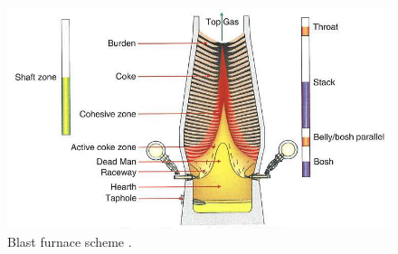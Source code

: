\begin{figure}[!htb]
\centering
\includegraphics[width=.86\columnwidth]{images/125blastfurnace}
\caption[Blast furnace scheme]{Blast furnace scheme \cite{RefWorks:200}.}
\label{fig:125blastfurnace}
\end{figure}